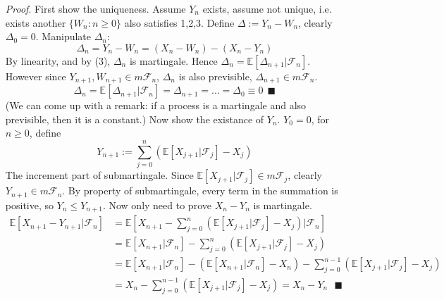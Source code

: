 \documentclass[a4paper,12pt,twoside]{book}
\begin{document}
\begin{itemize}
	\item[\textit{Proof}.] First show the uniqueness. Assume $Y_n$ exists, assume not unique, i.e. exists another $\{W_n: n\geq 0\}$ also satisfies 1,2,3. Define $\Delta:=Y_n-W_n$, clearly $\Delta_0=0$. Manipulate $\Delta_n$:
	\begin{equation}
		\Delta_n = Y_n - W_n = (X_n-W_n)-(X_n-Y_n)
	\end{equation}
	By linearity, and by (3), $\Delta_n$ is martingale. Hence $\Delta_n = \mathbb{E}\left[\Delta_{n+1}|\mathcal{F}_n\right]$. However since $Y_{n+1},W_{n+1}\in m \mathcal{F}_n$, $\Delta_n$ is also previsible, $\Delta_{n+1}\in m \mathcal{F}_n$.
	\begin{equation}
		\Delta_n = \mathbb{E}\left[\Delta_{n+1}|\mathcal{F}_n\right] = \Delta_{n+1} = ... = \Delta_0 \equiv 0~~\blacksquare
	\end{equation}
	(We can come up with a remark: if a process is a martingale and also previsible, then it is a constant.)\newline
	Now show the existance of $Y_n$. $Y_0=0$, for $n\geq 0$, define
	\begin{equation}
		Y_{n+1}:=\sum_{j=0}^n \left(\mathbb{E}\left[X_{j+1}|\mathcal{F}_j\right]-X_j \right)
	\end{equation}
	The increment part of submartingale. Since $\mathbb{E}\left[X_{j+1}|\mathcal{F}_j\right]\in m \mathcal{F}_j$, clearly $Y_{n+1}\in m \mathcal{F}_n$. By property of submartingale, every term in the summation is positive, so $Y_n \leq Y_{n+1}$. Now only need to prove $X_n - Y_n$ is martingale.
	\begin{equation}
		\begin{split}
			\mathbb{E}\left[X_{n+1}-Y_{n+1}|\mathcal{F}_n\right]&=\mathbb{E}\left[X_{n+1}-\sum_{j=0}^n \left(\mathbb{E}\left[X_{j+1}|\mathcal{F}_j\right]-X_j \right)|\mathcal{F}_n\right]\\
			&= \mathbb{E}\left[X_{n+1}|\mathcal{F}_n\right]-\sum_{j=0}^n \left(\mathbb{E}\left[X_{j+1}|\mathcal{F}_j\right]-X_j \right)\\
			&=\mathbb{E}\left[X_{n+1}|\mathcal{F}_n\right]-(\mathbb{E}\left[X_{n+1}|\mathcal{F}_n\right]-X_n)-\sum_{j=0}^{n-1} \left(\mathbb{E}\left[X_{j+1}|\mathcal{F}_j\right]-X_j \right)\\
			&= X_n - \sum_{j=0}^{n-1} \left(\mathbb{E}\left[X_{j+1}|\mathcal{F}_j\right]-X_j \right)=X_n-Y_n~~~\blacksquare
		\end{split}
	\end{equation}
\end{itemize}
\end{document}
